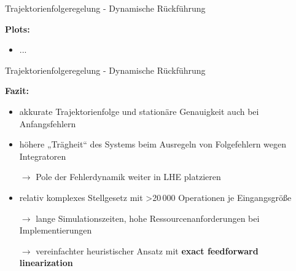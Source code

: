 \documentclass[
	ngerman,
	10pt,				%
	aspectratio=169 	%
]{beamer}
\begin{document}

\begin{frame}[t,fragile,label=trajektorienregelung_7]{\large Trajektorienfolgeregelung - Dynamische Rückführung}
	
	\textbf{Plots:}
	\begin{itemize}
		\item ...
	\end{itemize}
	
\end{frame}


\begin{frame}[t,fragile,label=trajektorienregelung_8]{\large Trajektorienfolgeregelung - Dynamische Rückführung}
	
	\textbf{Fazit:}
	\begin{itemize}
		\item akkurate Trajektorienfolge und stationäre Genauigkeit auch bei Anfangsfehlern
		\bigskip
		\pause
		\item höhere „Trägheit“ des Systems beim Ausregeln von Folgefehlern wegen Integratoren
		\item[$\rightarrow$] Pole der Fehlerdynamik weiter in LHE platzieren
		\bigskip
		\pause
		\item relativ komplexes Stellgesetz mit >20\,000 Operationen je Eingangsgröße
		\item[$\rightarrow$] lange Simulationszeiten, hohe Ressourcenanforderungen bei Implementierungen
		\pause
		\item[$\rightarrow$] vereinfachter heuristischer Ansatz mit \textbf{exact feedforward linearization}
	\end{itemize}
	
\end{frame}

\end{document}
